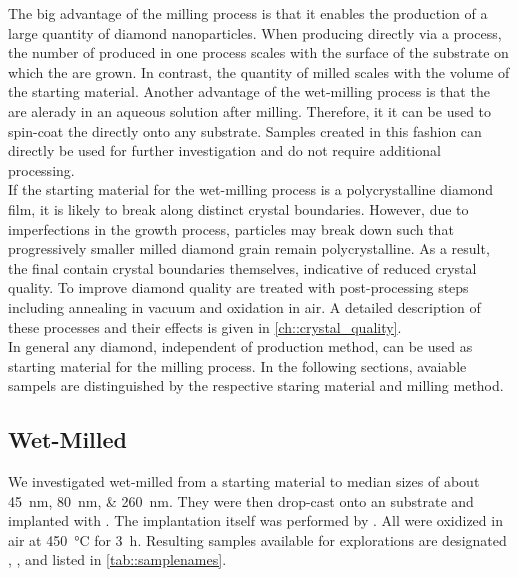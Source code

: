 	The big advantage of the milling process is that it enables the production of a large quantity of diamond nanoparticles.
	When producing \nds directly via a \CVD process, the number of produced \nds in one process scales with the surface of the substrate on which the \nds are grown.
	In contrast, the quantity of milled \nds scales with the volume of the starting material.
	Another advantage of the wet-milling process is that the \nds are alerady in an aqueous solution after milling.
	Therefore, it it can be used to spin-coat the \nds directly onto any substrate. Samples created in this fashion can directly be used for further investigation and do not require additional processing.
	\\
	If the starting material for the wet-milling process is a polycrystalline diamond film, it is likely to break along distinct crystal boundaries.
	However, due to imperfections in the growth process, particles may break down such that progressively smaller milled diamond grain remain polycrystalline.
	As a result, the final \nds contain crystal boundaries themselves, indicative of reduced crystal quality.
	To improve diamond quality \nds are treated with post-processing steps including annealing in vacuum and oxidation in air.
	A detailed description of these processes and their effects is given in \autoref{ch::crystal_quality}.
	\\
	In general any diamond, independent of production method, can be used as starting material for the milling process.
	In the following sections, avaiable sampels are distinguished by the respective staring material and milling method.

	\subsection{Wet-Milled \HPHT \Nds}\label{subsec::milled_hpht_nds}
		We investigated \nds wet-milled from a \HPHT starting material to median sizes of about \SIlist{45;80;260}{nm}.
		They were then drop-cast onto an \ir substrate and implanted with  . The implantation itself was performed by \rogalla.
		All \HPHT \nds were oxidized in air at \SI{450}{\celsius} for \SI{3}{\hour}. Resulting samples available for explorations are designated \hphtimpfortyfive, \hphtimpeighty, \hphtimptwosixty and listed in \autoref{tab::samplenames}.

